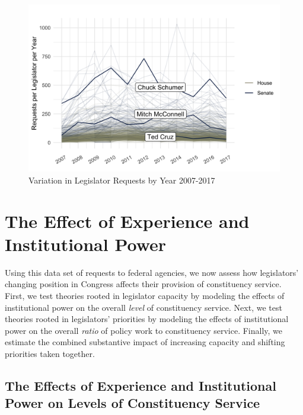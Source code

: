 \documentclass[12pt]{article}
\begin{document}
{\begin{figure}
\centering
\caption{Variation in Legislator Requests by Year 2007-2017} \label{f:peryear} 
\begin{minipage}{\textwidth}
\includegraphics[width = \textwidth]{figs/counts-per-year-1}
\end{minipage}
\end{figure}

\section{The Effect of Experience and Institutional Power}\label{s:results} 

Using this data set of requests to federal agencies, we now assess how legislators' changing position in Congress affects their provision of constituency service. First, we test theories rooted in legislator capacity by modeling the effects of institutional power on the overall \textit{level} of constituency service. Next, we test theories rooted in legislators' priorities by modeling the effects of institutional power on the overall \textit{ratio} of policy work to constituency service. Finally, we estimate the combined substantive impact of increasing capacity and shifting priorities taken together. 

\subsection{The Effects of Experience and Institutional Power on Levels of Constituency Service}\label{s:prestige}

}
\end{document}
